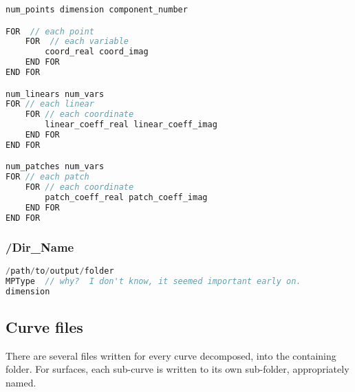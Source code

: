 \begin{center}\begin{minipage}{0.9\linewidth}
\begin{lstlisting}[language=c++, caption={\tt output/witness\_set}, captionpos=b]
num_points dimension component_number

FOR  // each point
	FOR  // each variable
		coord_real coord_imag
	END FOR
END FOR

num_linears num_vars
FOR // each linear
	FOR // each coordinate
		linear_coeff_real linear_coeff_imag
	END FOR
END FOR

num_patches num_vars
FOR // each patch
	FOR // each coordinate
		patch_coeff_real patch_coeff_imag
	END FOR
END FOR


\end{lstlisting}
\end{minipage}\end{center}




\subsubsection{/Dir\_Name}
\label{sec:dir_name}


\begin{center}\begin{minipage}{0.9\linewidth}
\begin{lstlisting}[language=c++, caption={\tt output/V.vertex}, captionpos=b]
/path/to/output/folder
MPType  // why?  I don't know, it seemed important early on.  
dimension 
\end{lstlisting}
\end{minipage}\end{center}

















\clearpage
\subsection{Curve files}
\label{sec:curve_files}

There are several files written for every curve decomposed, into the containing folder.  For surfaces, each sub-curve is written to its own sub-folder, appropriately named.

